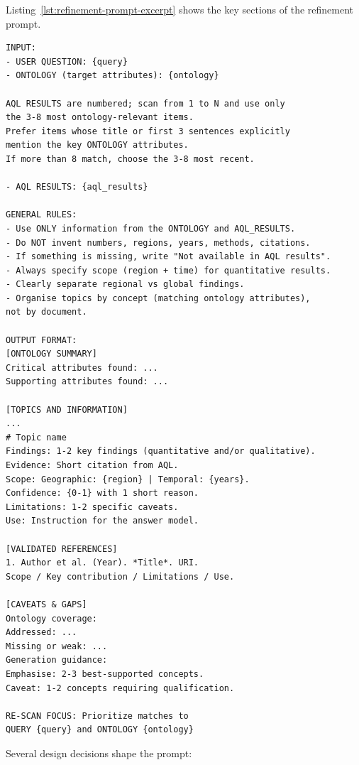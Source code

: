 Listing~\ref{lst:refinement-prompt-excerpt} shows the key sections of the refinement prompt.

\begin{lstlisting}[language={}, caption={Key sections of the refinement prompt.}, label={lst:refinement-prompt-excerpt}]
INPUT:
- USER QUESTION: {query}
- ONTOLOGY (target attributes): {ontology}

AQL RESULTS are numbered; scan from 1 to N and use only
the 3-8 most ontology-relevant items.
Prefer items whose title or first 3 sentences explicitly
mention the key ONTOLOGY attributes.
If more than 8 match, choose the 3-8 most recent.

- AQL RESULTS: {aql_results}

GENERAL RULES:
- Use ONLY information from the ONTOLOGY and AQL_RESULTS.
- Do NOT invent numbers, regions, years, methods, citations.
- If something is missing, write "Not available in AQL results".
- Always specify scope (region + time) for quantitative results.
- Clearly separate regional vs global findings.
- Organise topics by concept (matching ontology attributes),
not by document.

OUTPUT FORMAT:
[ONTOLOGY SUMMARY]
Critical attributes found: ...
Supporting attributes found: ...

[TOPICS AND INFORMATION]
...
# Topic name
Findings: 1-2 key findings (quantitative and/or qualitative).
Evidence: Short citation from AQL.
Scope: Geographic: {region} | Temporal: {years}.
Confidence: {0-1} with 1 short reason.
Limitations: 1-2 specific caveats.
Use: Instruction for the answer model.

[VALIDATED REFERENCES]
1. Author et al. (Year). *Title*. URI.
Scope / Key contribution / Limitations / Use.

[CAVEATS & GAPS]
Ontology coverage:
Addressed: ...
Missing or weak: ...
Generation guidance:
Emphasise: 2-3 best-supported concepts.
Caveat: 1-2 concepts requiring qualification.

RE-SCAN FOCUS: Prioritize matches to
QUERY {query} and ONTOLOGY {ontology}
\end{lstlisting}

Several design decisions shape the prompt:

